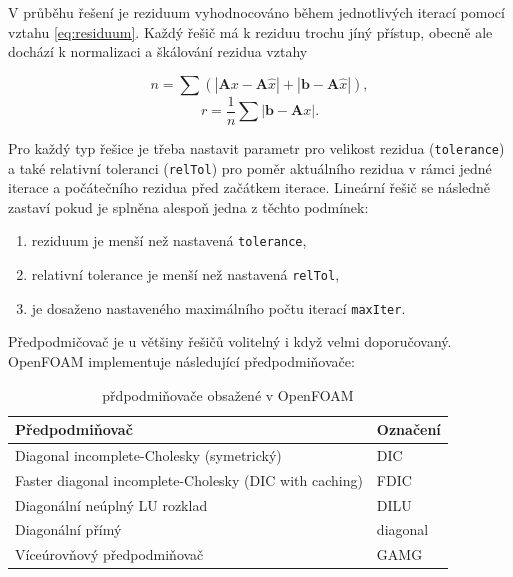 \documentclass[a4paper,12pt]{report}
\theoremstyle{remark}
\begin{document}
V průběhu řešení je reziduum vyhodnocováno během jednotlivých iterací pomocí vztahu \eqref{eq:residuum}. Každý řešič má k reziduu trochu jíný přístup, obecně ale dochází k normalizaci a škálování rezidua vztahy

$$n = \sum \left( | \boldsymbol{A}x - \boldsymbol{A}\hat{x} | + | \boldsymbol{b} - \boldsymbol{A}\hat{x} | \right),$$
$$r = \frac{1}{n} \sum | \boldsymbol{b} - \boldsymbol{A}x |.$$ 

Pro každý typ řešice je třeba nastavit parametr pro velikost rezidua (\texttt{tolerance}) a také relativní toleranci (\texttt{relTol}) pro poměr aktuálního rezidua v rámci jedné iterace a počátečního rezidua před začátkem iterace. Lineární řešič se následně zastaví pokud je splněna alespoň jedna z těchto podmínek:
\begin{enumerate}
	\item reziduum je menší než nastavená \texttt{tolerance},
	\item relativní tolerance je menší než nastavená \texttt{relTol},
	\item je dosaženo nastaveného maximálního počtu iterací \texttt{maxIter}.
\end{enumerate}




Předpodmičovač je u většiny řešičů volitelný i když velmi doporučovaný. OpenFOAM implementuje následující předpodmiňovače:

\begin{table}[H]
	\centering
	\caption{přdpodmiňovače obsažené v OpenFOAM}
	\renewcommand{\arraystretch}{1.7}
	\begin{tabular}{*2l}
		\toprule
		\textbf{Předpodmiňovač} & \textbf{Označení}\\
		\midrule
		{\small Diagonal incomplete-Cholesky (symetrický)}& DIC\\
		{\small Faster diagonal incomplete-Cholesky (DIC with caching)	}& FDIC \\		
		{\small Diagonální neúplný LU rozklad}& DILU  \\
		{\small Diagonální přímý}& diagonal \\
		{\small Víceúrovňový předpodmiňovač}& GAMG  \\
		\bottomrule
	\end{tabular}
	
	\label{table:solvers}
\end{table}
\end{document}

